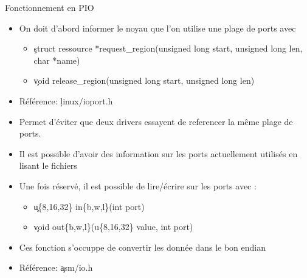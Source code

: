\begin{frame}[fragile=singleslide]{Fonctionnement en PIO}
  \begin{itemize} 
  \item On doit  d'abord informer le noyau que  l'on utilise une plage
    de ports avec
    \begin{itemize} 
    \item \c{struct ressource *request_region(unsigned long start, unsigned long len, char *name)}
    \item \c{void release_region(unsigned long start, unsigned long len)}
    \end{itemize}
  \item Référence: \c{linux/ioport.h}
  \item  Permet d'éviter que  deux drivers  essayent de  referencer la
    même plage de ports.
  \item  Il  est  possible  d'avoir  des  information  sur  les  ports
    actuellement utilisés en lisant le fichiers 
  \item Une fois réservé, il est possible de lire/écrire sur les ports
    avec :
    \begin{itemize} 
    \item \c{u\{8,16,32\} in\{b,w,l\}(int port)}
    \item \c{void out\{b,w,l\}(u\{8,16,32\} value, int port)}
    \end{itemize} 
  \item Ces  fonction s'occuppe  de convertir les  donnée dans  le bon
    endian
  \item Référence: \c{asm/io.h}
  \end{itemize} 
\end{frame} 

